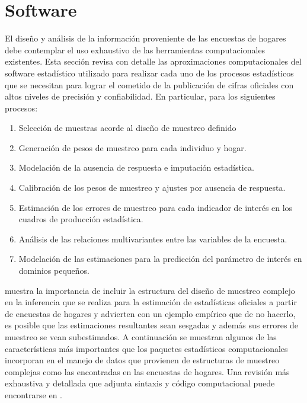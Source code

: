 \documentclass[12pt,spanish,]{book}
\providecommand{\tightlist}{%
  \setlength{\itemsep}{0pt}\setlength{\parskip}{0pt}}
\begin{document}
\hypertarget{software}{%
\section*{Software}\label{software}}

El diseño y análisis de la información proveniente de las encuestas de hogares debe contemplar el uso exhaustivo de las herramientas computacionales existentes. Esta sección revisa con detalle las aproximaciones computacionales del software estadístico utilizado para realizar cada uno de los procesos estadísticos que se necesitan para lograr el cometido de la publicación de cifras oficiales con altos niveles de precisión y confiabilidad. En particular, para los siguientes procesos:

\begin{enumerate}
\def\labelenumi{\arabic{enumi}.}
\tightlist
\item
  Selección de muestras acorde al diseño de muestreo definido
\item
  Generación de pesos de muestreo para cada individuo y hogar.
\item
  Modelación de la ausencia de respuesta e imputación estadística.
\item
  Calibración de los pesos de muestreo y ajustes por ausencia de respuesta.
\item
  Estimación de los errores de muestreo para cada indicador de interés en los cuadros de producción estadística.
\item
  Análisis de las relaciones multivariantes entre las variables de la encuesta.
\item
  Modelación de las estimaciones para la predicción del parámetro de interés en dominios pequeños.
\end{enumerate}

\textcite[sección 7.8]{United_Nations_2005} muestra la importancia de incluir la estructura del diseño de muestreo complejo en la inferencia que se realiza para la estimación de estadísticas oficiales a partir de encuestas de hogares y advierten con un ejemplo empírico que de no hacerlo, es posible que las estimaciones resultantes sean sesgadas y además sus errores de muestreo se vean subestimados. A continuación se muestran algunos de las características más importantes que los paquetes estadísticos computacionales incorporan en el manejo de datos que provienen de estructuras de muestreo complejas como las encontradas en las encuestas de hogares. Una revisión más exhaustiva y detallada que adjunta sintaxis y código computacional puede encontrarse en \textcite[Apéndice A]{Heeringa_West_Berglund_2010}.
\end{document}
